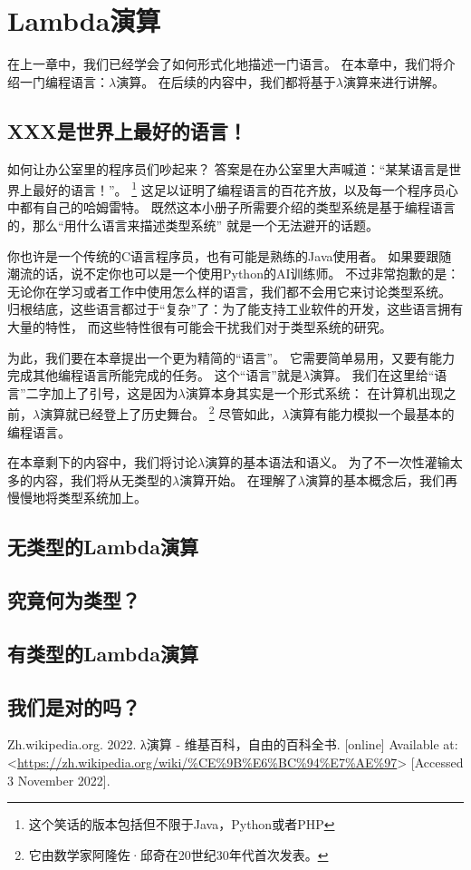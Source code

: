 \documentclass[../main.tex]{subfiles}
\begin{document}
  \section{Lambda演算}
  \indent 在上一章中，我们已经学会了如何形式化地描述一门语言。
  在本章中，我们将介绍一门编程语言：$\lambda$演算。
  在后续的内容中，我们都将基于$\lambda$演算来进行讲解。

  \subsection{XXX是世界上最好的语言！}
    \indent 如何让办公室里的程序员们吵起来？
    答案是在办公室里大声喊道：“某某语言是世界上最好的语言！”。
    \footnote[1]{这个笑话的版本包括但不限于Java，Python或者PHP}
    这足以证明了编程语言的百花齐放，以及每一个程序员心中都有自己的哈姆雷特。
    既然这本小册子所需要介绍的类型系统是基于编程语言的，那么“用什么语言来描述类型系统”
    就是一个无法避开的话题。

    \indent 你也许是一个传统的C语言程序员，也有可能是熟练的Java使用者。
    如果要跟随潮流的话，说不定你也可以是一个使用Python的AI训练师。
    不过非常抱歉的是：无论你在学习或者工作中使用怎么样的语言，我们都不会用它来讨论类型系统。
    归根结底，这些语言都过于“复杂”了：为了能支持工业软件的开发，这些语言拥有大量的特性，
    而这些特性很有可能会干扰我们对于类型系统的研究。

    \indent 为此，我们要在本章提出一个更为精简的“语言”。
    它需要简单易用，又要有能力完成其他编程语言所能完成的任务。
    这个“语言”就是$\lambda$演算。
    我们在这里给“语言”二字加上了引号，这是因为$\lambda$演算本身其实是一个形式系统：
    在计算机出现之前，$\lambda$演算就已经登上了历史舞台。
    \footnote[2]{它由数学家阿隆佐·邱奇在20世纪30年代首次发表。\cite{lamwiki}}
    尽管如此，$\lambda$演算有能力模拟一个最基本的编程语言。\cite{lamwiki}
    
    \indent 在本章剩下的内容中，我们将讨论$\lambda$演算的基本语法和语义。
    为了不一次性灌输太多的内容，我们将从无类型的$\lambda$演算开始。
    在理解了$\lambda$演算的基本概念后，我们再慢慢地将类型系统加上。

  \subsection{无类型的Lambda演算}

  \subsection{究竟何为类型？}

  \subsection{有类型的Lambda演算}

  \subsection{我们是对的吗？}

  \begin{thebibliography}{1}
     Zh.wikipedia.org. 2022. λ演算 - 维基百科，自由的百科全书. [online] Available at: <\url{https://zh.wikipedia.org/wiki/%CE%9B%E6%BC%94%E7%AE%97}> [Accessed 3 November 2022]. 
  \end{thebibliography}
\end{document}
